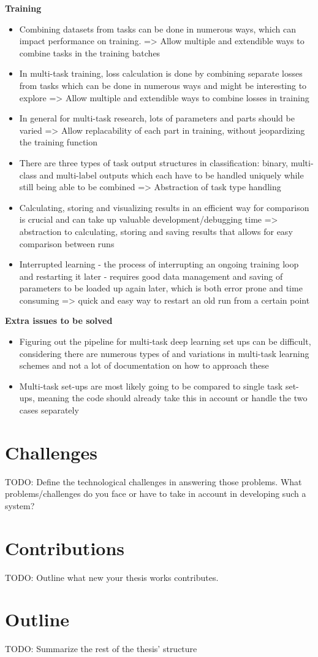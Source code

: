 \textbf{Training}
\begin{itemize}
	\item Combining datasets from tasks can be done in numerous ways, which can impact performance on training. => Allow multiple and extendible ways to combine tasks in the training batches
	\item In multi-task training, loss calculation is done by combining separate losses from tasks which can be done in numerous ways and might be interesting to explore => Allow multiple and extendible ways to combine losses in training
	\item In general for multi-task research, lots of parameters and parts should be varied => Allow replacability of each part in training, without jeopardizing the training function
	\item There are three types of task output structures in classification: binary, multi-class and multi-label outputs which each have to be handled uniquely while still being able to be combined => Abstraction of task type handling 
	\item Calculating, storing and visualizing results in an efficient way for comparison is crucial and can take up valuable development/debugging time => abstraction to calculating, storing and saving results that allows for easy comparison between runs
	\item Interrupted learning - the process of interrupting an ongoing training loop and restarting it later - requires good data management and saving of parameters to be loaded up again later, which is both error prone and time consuming => quick and easy way to restart an old run from a certain point
\end{itemize}

\textbf{Extra issues to be solved}
\begin{itemize}
	\item Figuring out the pipeline for multi-task deep learning set ups can be difficult, considering there are numerous types of and variations in multi-task learning schemes and not a lot of documentation on how to approach these
	\item Multi-task set-ups are most likely going to be compared to single task set-ups, meaning the code should already take this in account or handle the two cases separately
\end{itemize}

\section{Challenges}
TODO: Define the technological challenges in answering those problems. What problems/challenges do you face or have to take in account in developing such a system?

\section{Contributions}
TODO: Outline what new your thesis works contributes.

\section{Outline}
TODO: Summarize the rest of the thesis' structure